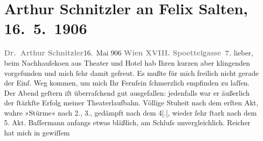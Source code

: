                \section[Arthur Schnitzler an Felix Salten, 16. 5. 1906]{ Arthur Schnitzler an Felix Salten, 16. 5. 1906}\nopagebreak{}\rehead{ }\begin{ledgroupsized}[t]{13cm}\normalsize\beginnumbering \toendnotes[C]{\smallbreak\pagebreak[2]} 
\toendnotes[C]{\smallbreak}\pstart
           \noindent{}{\pb}\textcolor{gray}{\textbf{Dr. Arthur Schnitzler}}\hfill 16. Mai 906\pend
           \pstart
           \textcolor{gray}{\textbf{Wien XVIII. Spoettelgasse 7.}}\pend
           \pstart
           lieber, beim Nachhauſeko{\geminationm}en aus Theater
               und Hotel hab \label{T_L03005-1v}\label{T_L03005-1h} Ihren
               kurzen aber klingenden \label{K_L03005-456v}\label{K_L03005-456h} vorgefunden und mich ſehr damit gefreut. Es mußte für mich freilich nicht
               gerade der Einſ. Weg kommen, um mich Ihr
               Fernſein ſchmerzlich empfinden zu laſſen. Der Abend geſtern iſt überraſchend gut
               ausgefallen: jedenfalls war er äußerlich der ſtärkſte Erfolg meiner Theaterlaufbahn.
               Völlige Stu{\geminationm}heit nach dem erſten Akt, wahre »Stürme«
               nach 2., 3., gedämpft nach dem 4{[}.{]}, wieder ſehr ſtark {\pb}nach dem 5. Akt. Baſſermann anfangs etwas bläßlich, am Schluſs
               unvergleichlich. Reicher hat mich in gewiſſem

\end{ledgroupsized}
